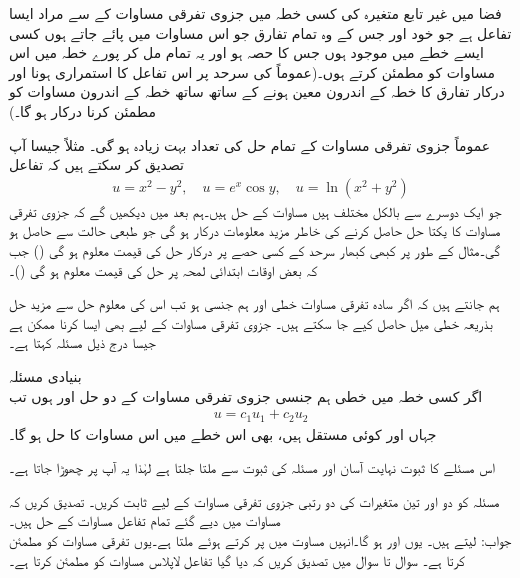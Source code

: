 فضا میں غیر تابع متغیرہ کی کسی خطہ   میں جزوی تفرقی مساوات کے  سے مراد ایسا تفاعل ہے جو خود اور جس کے وہ تمام تفارق جو اس مساوات میں پائے جاتے ہوں کسی ایسے خطے میں موجود ہوں  جس کا  حصہ ہو اور یہ تمام مل کر پورے خطہ  میں اس مساوات کو مطمئن کرتے ہوں۔(عموماً  کی سرحد پر اس تفاعل کا استمراری ہونا اور درکار تفارق کا خطہ کے اندرون معین ہونے کے ساتھ ساتھ خطہ کے اندرون مساوات کو مطمئن کرنا درکار ہو گا۔)

عموماً جزوی تفرقی مساوات کے تمام حل کی تعداد بہت زیادہ ہو گی۔ مثلاً جیسا آپ تصدیق کر سکتے ہیں کہ تفاعل
\begin{align}\label{مساوات_جزوی_مثال_تفاعل}
u=x^2-y^2,\quad u=e^x\cos y,\quad u=\ln(x^2+y^2)
\end{align} 
جو ایک دوسرے سے بالکل مختلف ہیں مساوات  کے حل ہیں۔ہم بعد میں دیکھیں گے کہ جزوی تفرقی مساوات کا یکتا حل حاصل کرنے کی خاطر مزید معلومات درکار ہو گی جو طبعی حالت سے حاصل ہو گی۔مثال کے طور پر کبھی کبھار سرحد کے کسی حصے پر درکار حل کی قیمت معلوم ہو گی () جب کہ بعض اوقات ابتدائی لمحہ  پر حل کی قیمت معلوم ہو گی ()۔ 

ہم جانتے ہیں کہ اگر سادہ تفرقی مساوات خطی اور ہم جنسی ہو تب اس کی معلوم حل سے مزید حل بذریعہ خطی میل حاصل کیے جا سکتے ہیں۔ جزوی تفرقی مساوات کے لیے بھی ایسا کرنا ممکن ہے جیسا درج ذیل مسئلہ کہتا ہے۔

\quad بنیادی مسئلہ\\
اگر کسی خطہ  میں  خطی ہم جنسی جزوی تفرقی مساوات کے دو حل  اور  ہوں تب
\begin{align*}
u=c_1u_1+c_2u_2
\end{align*} 
جہاں  اور  کوئی مستقل ہیں، بھی اس خطے میں اس مساوات کا حل ہو گا۔

اس مسئلے کا ثبوت نہایت آسان اور مسئلہ  کی ثبوت سے ملتا جلتا ہے لہٰذا یہ آپ پر چھوڑا جاتا ہے۔


\quad
مسئلہ  کو دو اور تین متغیرات کی دو رتبی جزوی تفرقی مساوات کے لیے ثابت کریں۔
\quad تصدیق کریں کہ مساوات  میں دیے گئے تمام تفاعل مساوات  کے حل ہیں۔\\
جواب:\quad {} لیتے ہیں۔ یوں  اور  ہو گا۔انہیں مساوت  میں پر کرتے ہوئے  ملتا ہے۔یوں  تفرقی مساوات کو مطمئن کرتا ہے۔
سوال  تا سوال  میں تصدیق کریں کہ دیا گیا تفاعل لاپلاس مساوات کو مطمئن کرتا ہے۔

